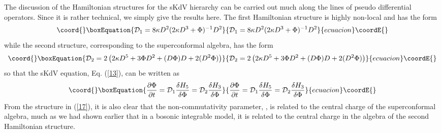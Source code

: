 \documentclass[a4paper,11pt]{article}
\begin{document}
The discussion of the Hamiltonian structures for the sKdV hierarchy can
be carried out much along the lines of pseudo differential
operators. Since it is rather technical, we simply give the results
here. The first Hamiltonian structure is highly non-local and has the
form
\begin{equation}\coord{}\boxEquation{
{\cal D}_{1} = 8\kappa D^{2} (2\kappa D^{3}+\Phi)^{-1} D^{2}\label{16}
}{
{\cal D}_{1} = 8\kappa D^{2} (2\kappa D^{3}+\Phi)^{-1} D^{2}}{ecuacion}\coordE{}\end{equation}
while the second structure, corresponding to the superconformal
algebra, has the form
\begin{equation}\coord{}\boxEquation{
{\cal D}_{2} = 2 \left(2\kappa D^{5} + 3\Phi D^{2} + (D\Phi) D + 2
(D^{2}\Phi)\right)\label{17}
}{
{\cal D}_{2} = 2 \left(2\kappa D^{5} + 3\Phi D^{2} + (D\Phi) D + 2
(D^{2}\Phi)\right)}{ecuacion}\coordE{}\end{equation}
so that the sKdV equation, Eq. (\ref{13}), can be written as
\begin{equation}\coord{}\boxEquation{
{\partial \Phi\over \partial t} = {\cal D}_{1} {\delta H_{5}\over
\delta \Phi} = {\cal D}_{2} {\delta H_{3}\over \delta \Phi}
}{
{\partial \Phi\over \partial t} = {\cal D}_{1} {\delta H_{5}\over
\delta \Phi} = {\cal D}_{2} {\delta H_{3}\over \delta \Phi}
}{ecuacion}\coordE{}\end{equation}
From the structure in (\ref{17}), it is also clear that the
non-commutativity parameter, \myHighlight{$\kappa$}\coordHE{}, is related to the central
charge of the superconformal algebra, much as we had shown earlier
\cite{13} 
that in a bosonic integrable model, it is related to the central
charge in the algebra of the second Hamiltonian structure.
\end{document}
